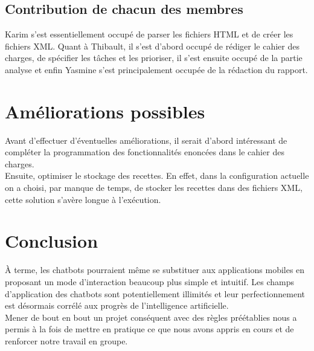 \documentclass{report}
\begin{document}
\subsection{Contribution de chacun des membres}
Karim s'est essentiellement occupé de parser les fichiers HTML et de créer les fichiers XML. Quant à Thibault, il s'est d'abord occupé de rédiger le cahier des charges, de spécifier les tâches et les prioriser, il s'est ensuite occupé de la partie analyse et enfin Yasmine s'est principalement occupée de la rédaction du rapport.
\section{Améliorations possibles}

Avant d'effectuer d'éventuelles améliorations, il serait d'abord intéressant de compléter la programmation des fonctionnalités enoncées dans le cahier des charges.\\
Ensuite, optimiser le stockage des recettes. En effet, dans la configuration actuelle on a choisi, par manque de temps, de stocker les recettes dans des fichiers XML, cette solution s'avère longue à l'exécution.

\section*{Conclusion}À terme, les chatbots pourraient même se substituer aux applications mobiles en proposant un mode d'interaction beaucoup plus simple et intuitif. Les champs d'application des chatbots sont potentiellement illimités et leur perfectionnement est désormais corrélé aux progrès de l'intelligence artificielle.\\

Mener de bout en bout un projet conséquent avec des règles préétablies nous a permis à la fois de mettre en pratique ce que nous avons appris en cours et de renforcer notre travail en groupe.
\end{document}
